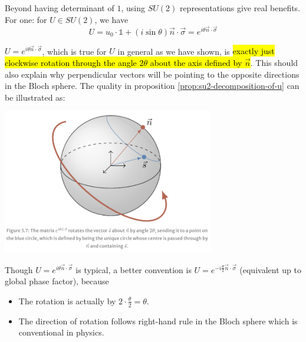 \documentclass[12pt]{article}
\begin{document}
\begin{proposition}\label{prop:su2-decomposition-of-u}
Beyond having determinant of $1$, using $SU(2)$ representations give real benefits. For one: for $U\in SU(2)$, we have $$
\boxed{U = u_0 \cdot \mathbb{1} + (i\sin\theta)\vec{n} \cdot \vec{\sigma} = e^{i\theta \vec{n}\cdot \vec{\sigma}}}
$$
\end{proposition}

\begin{remark}[The form, $U = e^{i\theta \vec{n}\cdot \vec{\sigma}}$ is super important!]
$U = e^{i\theta \vec{n}\cdot \vec{\sigma}}$, which is true for $U$ in general as we have shown, is \hl{exactly just clockwise rotation through the angle $2\theta$ about the axis defined by $\vec{n}$}. This should also explain why perpendicular vectors will be pointing to the opposite directions in the Bloch sphere. The quality in proposition \ref{prop:su2-decomposition-of-u} can be illustrated as:
\begin{center}
\includegraphics[width = 25em]{images/6.jpg}
\end{center}
\end{remark}

\begin{remark}[]
Though $U = e^{i\theta \vec{n}\cdot \vec{\sigma}}$ is typical, a better convention is $U = e^{-i\frac{\theta}{2} \vec{n}\cdot \vec{\sigma}}$ (equivalent up to global phase factor), because
\begin{itemize}
    \item The rotation is actually by $2\cdot \frac{\theta}{2} = \theta$.
    \item The direction of rotation follows right-hand rule in the Bloch sphere which is conventional in physics.
\end{itemize}
\end{remark}
\end{document}
